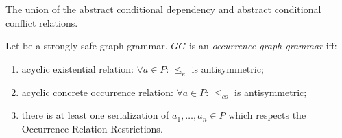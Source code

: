 \begin{definition} The union of the abstract conditional dependency and abstract conditional conflict relations.
\end{definition}

\begin{definition} Let \doublyTypedGraphGrammarCore{} be a strongly safe graph grammar. $GG$ is an \emph{occurrence graph grammar} iff:

  \begin{enumerate}
    \item acyclic existential relation: $\forall a \in P$: $\leq_e$ is antisymmetric;
    \item acyclic concrete occurrence relation: $\forall a \in P$: $\leq_{co}$ is antisymmetric;
    \item there is at least one serialization of $a_1,\ldots,a_n \in P$ which respects the Occurrence Relation Restrictions.
  \end{enumerate}
\end{definition}

\begin{definition}
\end{definition}

